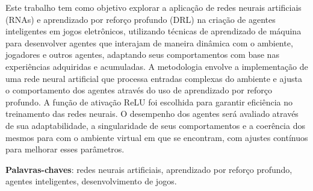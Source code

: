 \setlength{\absparsep}{18pt} %
\begin{resumo}
    
    Este trabalho tem como objetivo explorar a aplicação de redes neurais artificiais (RNAs) e aprendizado por reforço profundo (DRL) na criação de agentes inteligentes em jogos eletrônicos, utilizando técnicas de aprendizado de máquina para desenvolver agentes que interajam de maneira dinâmica com o ambiente, jogadores e outros agentes, adaptando seus comportamentos com base nas experiências adquiridas e acumuladas. A metodologia envolve a implementação de uma rede neural artificial que processa entradas complexas do ambiente e ajusta o comportamento dos agentes através do uso de aprendizado por reforço profundo. A função de ativação ReLU foi escolhida para garantir eficiência no treinamento das redes neurais. O desempenho dos agentes será avaliado através de sua adaptabilidade, a singularidade de seus comportamentos e a coerência dos mesmos para com o ambiente virtual em que se encontram, com ajustes contínuos para melhorar esses parâmetros.

 \textbf{Palavras-chaves}: redes neurais artificiais, aprendizado por reforço profundo, agentes inteligentes, desenvolvimento de jogos.
\end{resumo}